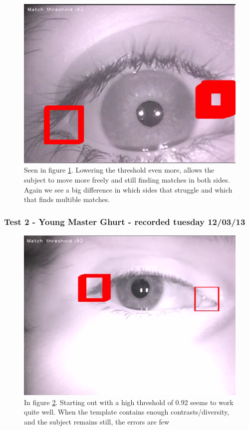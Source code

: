 \begin{figure}[htbp]
\centering
\includegraphics{pics/template_matching/3.png}
\caption{Seen in figure \ref{tm3}. Lowering the threshold even more,
allows the subject to move more freely and still finding matches in both
sides. Again we see a big difference in which sides that struggle and
which that finds multible matches. \label{tm3}}
\end{figure}

\subsubsection{Test 2 - Young Master Ghurt - recorded tuesday 12/03/13}

\begin{figure}[htbp]
\centering
\includegraphics{pics/template_matching/4.png}
\caption{In figure \ref{tm4}. Starting out with a high threshold of 0.92
seems to work quite well. When the template contains enough
contrasts/diversity, and the subject remains still, the errors are few
\label{tm4}}
\end{figure}

